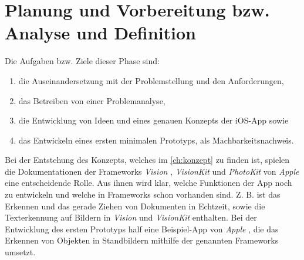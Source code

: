 \documentclass[notables, nomenclature, oneside, 150]{HSMW-Thesis}
\begin{document}
	\section{Planung und Vorbereitung bzw. Analyse und Definition}\label{sc:analyse}
		Die Aufgaben bzw. Ziele dieser Phase sind: \begin{enumerate}
			\item die Auseinandersetzung mit der Problemstellung und den Anforderungen,
			\item das Betreiben von einer Problemanalyse,
			\item die Entwicklung von Ideen und eines genauen Konzepts der iOS-App sowie 
			\item das Entwickeln eines ersten minimalen Prototyps, als Machbarkeitsnachweis.
		\end{enumerate}
		
		Bei der Entstehung des Konzepts, welches im \autoref{ch:konzept} zu finden ist, spielen die Dokumentationen der Frameworks \textit{Vision} , \textit{VisionKit} und \textit{PhotoKit} von \textit{Apple} eine entscheidende Rolle. Aus ihnen wird klar, welche Funktionen der App noch zu entwickeln und welche in Frameworks schon vorhanden sind. Z. B. ist das Erkennen und das gerade Ziehen von Dokumenten in Echtzeit, sowie die Texterkennung auf Bildern in \textit{Vision} und \textit{VisionKit} enthalten. Bei der Entwicklung des ersten Prototyps half eine Beispiel-App von \textit{Apple} \cite{apple_detecting_2019}, die das Erkennen von Objekten in Standbildern mithilfe der genannten Frameworks umsetzt.
		
\end{document}
